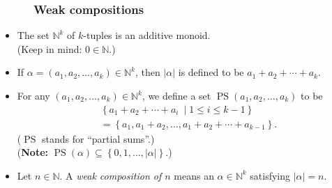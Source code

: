 \documentclass{beamer}
\newcommand{\NN}{{\mathbb N}}
\newcommand{\PS}{\operatorname{PS}}
\newcommand{\fti}[1]{\frametitle{\ \ \ \ \ #1}}
\newcommand{\set}[1]{\left\{ #1 \right\}}
\newcommand{\abs}[1]{\left| #1 \right|}
\newcommand{\tup}[1]{\left( #1 \right)}
\newcommand{\defn}[1]{{\color{darkred}\emph{#1}}} %
\theoremstyle{plain}
\begin{document}
\begin{frame}
\fti{Weak compositions}

\begin{itemize}

\item The set $\NN^k$ of $k$-tuples is an additive monoid. \\
      (Keep in mind: $0 \in \NN$.)

\item If $\alpha = \tup{a_1, a_2, \ldots, a_k} \in \NN^k$, then
      \defn{$\abs{\alpha}$} is defined to be
      $a_1 + a_2 + \cdots + a_k$.

\pause

\item For any $\tup{a_1, a_2, \ldots, a_k} \in \NN^k$, we
      define a set
      \defn{$\PS \tup{a_1, a_2, \ldots, a_k}$} to be
      \begin{align*}
      & \set{a_1 + a_2 + \cdots + a_i \ \mid  1 \leq i \leq k-1 } \\
      & = \set{a_1, a_1 + a_2, \ldots, a_1 + a_2 + \cdots + a_{k-1}} .
      \end{align*}
      ($\PS$ stands for ``partial sums''.)
      \pause \\
      (\textbf{Note:}
      $\PS \tup{\alpha}
      \subseteq \set{0, 1, \ldots, \abs{\alpha}}$.)

\pause

\item Let $n \in \NN$.
      A \defn{weak composition of $n$} means an
      $\alpha \in \NN^k$ satisfying $\abs{\alpha} = n$.

\end{itemize}

\end{frame}
\end{document}
